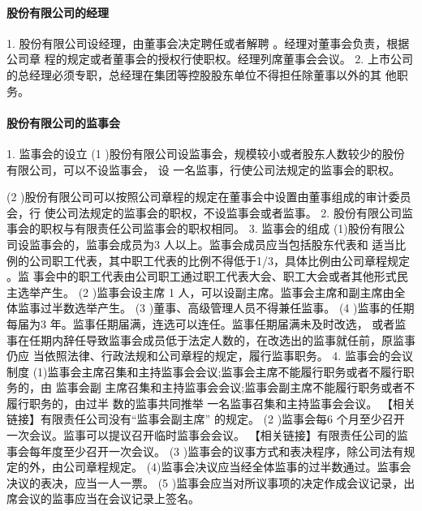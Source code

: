 \documentclass[UTF8,12pt]{ctexart}
\numberwithin{equation}{section} %
\numberwithin{figure}{section}
\numberwithin{table}{section}
\begin{document}
	\paragraph{股份有限公司的经理}
	1. 股份有限公司设经理，由董事会决定聘任或者解聘 。经理对董事会负责，根据公司章 程的规定或者董事会的授权行使职权。经理列席董事会会议。
	2. 上市公司的总经理必须专职，总经理在集团等控股股东单位不得担任除董事以外的其 他职务。
	
	\paragraph{股份有限公司的监事会}
	1. 监事会的设立
	(1 )股份有限公司设监事会，规模较小或者股东人数较少的股份有限公司，可以不设监事会， 设 一名监事，行使公司法规定的监事会的职权。
	
	(2 )股份有限公司可以按照公司章程的规定在董事会中设置由董事组成的审计委员会，行 使公司法规定的监事会的职权，不设监事会或者监事。
	2. 股份有限公司监事会的职权与有限责任公司监事会的职权相同。
	3. 监事会的组成
	(1)股份有限公司设监事会的，监事会成员为3 人以上。监事会成员应当包括股东代表和 适当比例的公司职工代表，其中职工代表的比例不得低于1/3，具体比例由公司章程规定 。监 事会中的职工代表由公司职工通过职工代表大会、职工大会或者其他形式民主选举产生。
	(2 )监事会设主席 1 人，可以设副主席。监事会主席和副主席由全体监事过半数选举产生。 (3 )董事、高级管理人员不得兼任监事。
	(4 )监事的任期每届为3 年。监事任期届满，连选可以连任。监事任期届满未及时改选， 或者监事在任期内辞任导致监事会成员低于法定人数的，在改选出的监事就任前，原监事仍应 当依照法律、行政法规和公司章程的规定，履行监事职务。
	4. 监事会的会议制度 (1)监事会主席召集和主持监事会会议;监事会主席不能履行职务或者不履行职务的，由 监事会副 主席召集和主持监事会会议;监事会副主席不能履行职务或者不履行职务的，由过半 数的监事共同推举 一名监事召集和主持监事会会议。
	【相关链接】有限责任公司没有“监事会副主席” 的规定。
	(2 )监事会每6 个月至少召开一次会议。监事可以提议召开临时监事会会议。
	【相关链接】有限责任公司的监事会每年度至少召开一次会议。
	(3 )监事会的议事方式和表决程序，除公司法有规定的外，由公司章程规定。 (4)监事会决议应当经全体监事的过半数通过。监事会决议的表决，应当一人一票。
	(5 )监事会应当对所议事项的决定作成会议记录，出席会议的监事应当在会议记录上签名。
	
\end{document}
